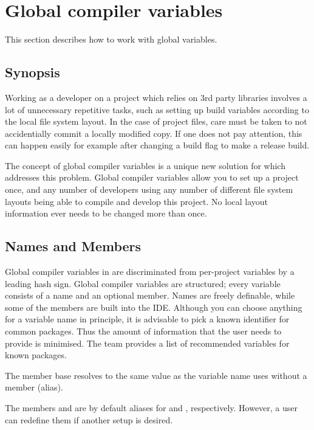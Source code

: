 \section{Global compiler variables}\label{sec:global_variables}

This section describes how to work with global variables.

\subsection{Synopsis}

Working as a developer on a project which relies on 3rd party libraries involves a lot of unnecessary repetitive tasks, such as setting up build variables according to the local file system layout. In the case of project files, care must be taken to not accidentially commit a locally modified copy. If one does not pay attention, this can happen easily for example after changing a build flag to make a release build.

The concept of global compiler variables is a unique new solution for \codeblocks which addresses this problem. Global compiler variables allow you to set up a project once, and any number of developers using any number of different file system layouts being able to compile and develop this project. No local layout information ever needs to be changed more than once.

\subsection{Names and Members}

Global compiler variables in \codeblocks are discriminated from per-project variables by a leading hash sign. Global compiler variables are structured; every variable consists of a name and an optional member. Names are freely definable, while some of the members are built into the IDE. Although you can choose anything for a variable name in principle, it is advisable to pick a known identifier for common packages. Thus the amount of information that the user needs to provide is minimised. The \codeblocks team provides a list of recommended variables for known packages.

The member base resolves to the same value as the variable name uses without a member (alias).

The members  and  are by default aliases for  and , respectively. However, a user can redefine them if another setup is desired.

